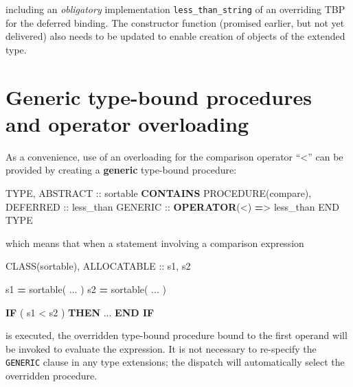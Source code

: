 \documentclass[
]{article}
\newenvironment{Shaded}{}{}
\newcommand{\DataTypeTok}[1]{\textcolor[rgb]{0.56,0.13,0.00}{#1}}
\newcommand{\KeywordTok}[1]{\textcolor[rgb]{0.00,0.44,0.13}{\textbf{#1}}}
\newcommand{\NormalTok}[1]{#1}
\newcommand{\OperatorTok}[1]{\textcolor[rgb]{0.40,0.40,0.40}{#1}}
\begin{document}
including an \emph{obligatory} implementation
\texttt{less\_than\_string} of an overriding TBP for the deferred
binding. The constructor function (promised earlier, but not yet
delivered) also needs to be updated to enable creation of objects of the
extended type.

\section{Generic type-bound procedures and operator
overloading}\label{generic-type-bound-procedures-and-operator-overloading}

As a convenience, use of an overloading for the comparison operator
``\textless{}'' can be provided by creating a \textbf{generic}
type-bound procedure:

\begin{Shaded}
\begin{Highlighting}[]
\DataTypeTok{TYPE}\NormalTok{, }\DataTypeTok{ABSTRACT} \DataTypeTok{::}\NormalTok{ sortable}
\KeywordTok{CONTAINS}
   \DataTypeTok{PROCEDURE(compare)}\NormalTok{, }\DataTypeTok{DEFERRED} \DataTypeTok{::}\NormalTok{ less\_than}
   \DataTypeTok{GENERIC} \DataTypeTok{::} \KeywordTok{OPERATOR}\NormalTok{(}\OperatorTok{\textless{}}\NormalTok{) }\KeywordTok{=}\OperatorTok{\textgreater{}}\NormalTok{ less\_than}
\DataTypeTok{END TYPE}
\end{Highlighting}
\end{Shaded}

which means that when a statement involving a comparison expression

\begin{Shaded}
\begin{Highlighting}[]
\DataTypeTok{CLASS(sortable)}\NormalTok{, }\DataTypeTok{ALLOCATABLE} \DataTypeTok{::}\NormalTok{ s1, s2}

\NormalTok{s1 }\KeywordTok{=}\NormalTok{ sortable( ... )}
\NormalTok{s2 }\KeywordTok{=}\NormalTok{ sortable( ... )}

\KeywordTok{IF}\NormalTok{ ( s1 }\OperatorTok{\textless{}}\NormalTok{ s2 ) }\KeywordTok{THEN}
\NormalTok{   ...}
\KeywordTok{END IF}
\end{Highlighting}
\end{Shaded}

is executed, the overridden type-bound procedure bound to the first
operand will be invoked to evaluate the expression. It is not necessary
to re-specify the \texttt{GENERIC} clause in any type extensions; the
dispatch will automatically select the overridden procedure.
\end{document}
